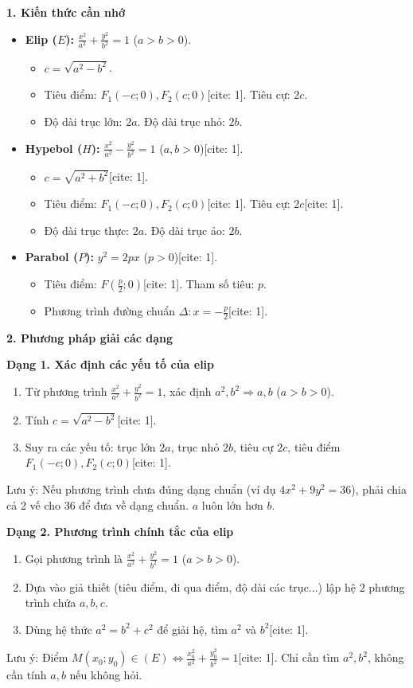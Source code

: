 \textbf{1. Kiến thức cần nhớ}
\begin{itemize}
\item \textbf{Elip ($E$):} $\frac{x^2}{a^2} + \frac{y^2}{b^2} = 1$ ($a > b > 0$).
  \begin{itemize}
  \item $c = \sqrt{a^2 - b^2}$.
  \item Tiêu điểm: $F_1(-c; 0), F_2(c; 0)$[cite: 1]. Tiêu cự: $2c$.
  \item Độ dài trục lớn: $2a$. Độ dài trục nhỏ: $2b$.
  \end{itemize}
\item \textbf{Hypebol ($H$):} $\frac{x^2}{a^2} - \frac{y^2}{b^2} = 1$ ($a, b > 0$)[cite: 1].
  \begin{itemize}
  \item $c = \sqrt{a^2 + b^2}$[cite: 1].
  \item Tiêu điểm: $F_1(-c; 0), F_2(c; 0)$[cite: 1]. Tiêu cự: $2c$[cite: 1].
  \item Độ dài trục thực: $2a$. Độ dài trục ảo: $2b$.
  \end{itemize}
\item \textbf{Parabol ($P$):} $y^2 = 2px$ ($p > 0$)[cite: 1].
  \begin{itemize}
  \item Tiêu điểm: $F\left(\frac{p}{2}; 0\right)$[cite: 1]. Tham số tiêu: $p$.
  \item Phương trình đường chuẩn $\Delta: x = -\frac{p}{2}$[cite: 1].
  \end{itemize}
\end{itemize}

\textbf{2. Phương pháp giải các dạng}

\textbf{Dạng 1. Xác định các yếu tố của elip}
\begin{enumerate}
\item Từ phương trình $\frac{x^2}{a^2} + \frac{y^2}{b^2} = 1$, xác định $a^2, b^2 \Rightarrow a, b$ ($a > b > 0$).
\item Tính $c = \sqrt{a^2 - b^2}$[cite: 1].
\item Suy ra các yếu tố: trục lớn $2a$, trục nhỏ $2b$, tiêu cự $2c$, tiêu điểm $F_1(-c; 0), F_2(c; 0)$[cite: 1].
\end{enumerate}
Lưu ý: Nếu phương trình chưa đúng dạng chuẩn (ví dụ $4x^2 + 9y^2 = 36$), phải chia cả 2 vế cho 36 để đưa về dạng chuẩn. $a$ luôn lớn hơn $b$.

\textbf{Dạng 2. Phương trình chính tắc của elip}
\begin{enumerate}
\item Gọi phương trình là $\frac{x^2}{a^2} + \frac{y^2}{b^2} = 1$ ($a > b > 0$).
\item Dựa vào giả thiết (tiêu điểm, đi qua điểm, độ dài các trục...) lập hệ $2$ phương trình chứa $a, b, c$.
\item Dùng hệ thức $a^2 = b^2 + c^2$ để giải hệ, tìm $a^2$ và $b^2$[cite: 1].
\end{enumerate}
Lưu ý: Điểm $M(x_0; y_0) \in (E) \Leftrightarrow \frac{x_0^2}{a^2} + \frac{y_0^2}{b^2} = 1$[cite: 1]. Chỉ cần tìm $a^2, b^2$, không cần tính $a, b$ nếu không hỏi.

